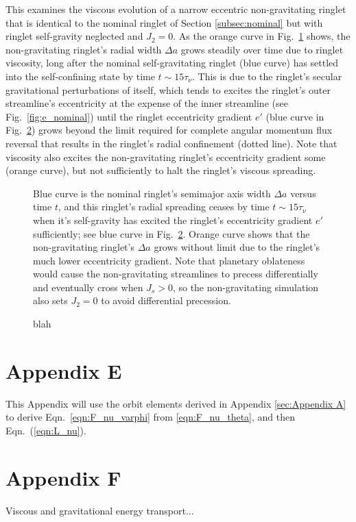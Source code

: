 \documentclass[preprint]{aastex62}
\begin{document}
This examines the viscous evolution of a narrow eccentric non-gravitating
ringlet that is identical to the nominal ringlet of Section \ref{subsec:nominal} but
with ringlet self-gravity neglected and $J_2=0$.
As the orange curve in Fig.\ \ref{fig:da_nogravity} shows, the non-gravitating ringlet's
radial width $\Delta a$ grows steadily over time due to ringlet viscosity, 
long after the nominal self-gravitating ringlet (blue curve)
has settled into the self-confining state by time $t\sim15\tau_\nu$. This is due to the
ringlet's secular gravitational perturbations of itself,
which tends to excites the ringlet's outer streamline's eccentricity at the expense
of the inner streamline (see Fig.\ \ref{fig:e_nominal}) until the ringlet eccentricity gradient $e'$
(blue curve in Fig.\ \ref{fig:de_prime_nogravity}) grows beyond the
limit required for complete angular momentum flux reversal 
that results in the ringlet's radial confinement (dotted line). 
Note that viscosity also excites the non-gravitating
ringlet's eccentricity gradient some (orange curve), but not sufficiently to halt the ringlet's 
viscous spreading.

\begin{figure}
    \caption{
        \label{fig:da_nogravity}
        Blue curve is the nominal ringlet's semimajor axis width $\Delta a$ versus time $t$,
        and this ringlet's radial spreading ceases by time $t\sim15\tau_\nu$ when it's self-gravity
        has excited the ringlet's eccentricity gradient $e'$ sufficiently; 
        see blue curve in Fig.\ \ref{fig:de_prime_nogravity}. Orange curve shows that
        the non-gravitating ringlet's $\Delta a$ grows without limit due to the ringlet's
        much lower eccentricity gradient. Note that planetary oblateness would
        cause the non-gravitating streamlines to precess differentially and eventually cross
        when $J_s>0$, so the non-gravitating simulation also sets $J_2=0$ 
        to avoid differential precession.
    }
\end{figure}

\begin{figure}
    \caption{
        \label{fig:de_prime_nogravity}
        blah
    }
\end{figure}

\section{Appendix E}
\label{sec:Appendix E}

This Appendix will use the orbit elements derived in Appendix \ref{sec:Appendix A} to
derive Eqn.\ \ref{eqn:F_nu_varphi} from \ref{eqn:F_nu_theta}, and then Eqn.\ (\ref{eqn:L_nu}).

\section{Appendix F}
\label{sec:Appendix F}

Viscous and gravitational energy transport...



\end{document}
